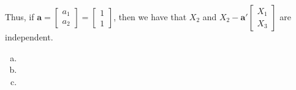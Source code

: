 \documentclass[12pt]{article}\usepackage[]{graphicx}\usepackage[]{color}
\newenvironment{problem}[2][Problem]{\begin{trivlist}
\item[\hskip \labelsep {\bfseries #1}\hskip \labelsep {\bfseries #2.}]}{\end{trivlist}}
\newcommand{\vct}{\mathbf}
\begin{document}
Thus, if $\vct{a} = \begin{bmatrix} a_1 \\ a_2 \end{bmatrix} = \begin{bmatrix} 1 \\ 1 \end{bmatrix}$, then we have that $X_2$ and $X_2 - \vct{a}'\begin{bmatrix} X_1 \\ X_3 \end{bmatrix}$ are independent.

\begin{problem}{4.5}
\end{problem}

\begin{enumerate}[a)]

\item

\item

\item

\end{enumerate}

\begin{problem}{4.6}
\end{problem}

\begin{problem}{4.7}
\end{problem}

\begin{problem}{4.10}
\end{problem}

\begin{problem}{4.11}
\end{problem}

\begin{problem}{4.12}
\end{problem}

\begin{problem}{4.13}
\end{problem}

\begin{problem}{4.14}
\end{problem}

\begin{problem}{4.15}
\end{problem}

\begin{problem}{4.16}
\end{problem}

\begin{problem}{4.17}
\end{problem}

\begin{problem}{4.18}
\end{problem}

\begin{problem}{4.19}
\end{problem}

\begin{problem}{4.20}
\end{problem}

\begin{problem}{4.21}
\end{problem}
\end{document}
